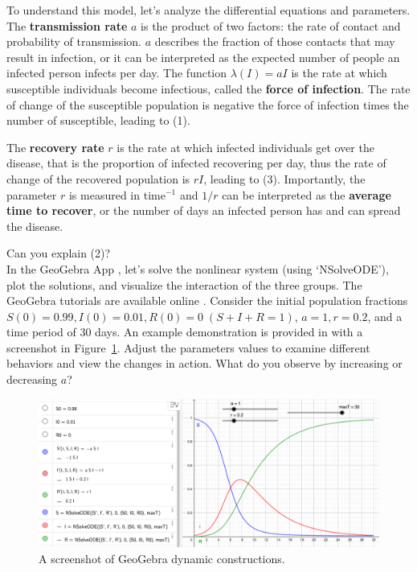 \documentclass[10pt,letterpaper]{article}
\begin{document}
To understand this model, let's analyze the differential equations and parameters. The {\bf transmission rate} $a$ is the product of two factors:  the rate of contact and probability of transmission. $a$ describes the fraction of those contacts that may result in infection, or it can be interpreted as the expected number of people an infected person infects per day. The function $\lambda(I)=aI$ is the rate at which susceptible individuals become infectious, called the {\bf force of infection}. The rate of change of the susceptible population is negative the force of infection times the number of susceptible, leading to (1).

The {\bf recovery rate} $r$ is the rate at which infected individuals get over the disease, that is the proportion of infected recovering per day, thus the rate of change of the recovered population is $rI$, leading to (3). Importantly, the parameter $r$ is measured in time$^{-1}$ and $1/r$ can be interpreted as the {\bf average time to recover}, or the number of days an infected person has and can spread the disease.

Can you explain (2)?\\

In the GeoGebra App \cite{GeoGebra1}, let's solve the nonlinear system (using `NSolveODE'), plot the solutions, and visualize the interaction of the three groups. The GeoGebra tutorials are available online \cite{GeoGebra2}. Consider the initial population fractions $S(0)=0.99, I(0)=0.01, R(0)=0 \; (S+I+R=1)$, $a=1, r=0.2$, and a time period of 30 days. An example demonstration is provided in \cite{Wang2020} with a screenshot in Figure~\ref{fig:GeoGebra}. Adjust the parameters values to examine different behaviors and view the changes in action. What do you observe by increasing or decreasing $a$? 

\begin{figure}[htb]
\includegraphics[width=5.4in]{GeoGebra}
\centering
\caption{\label{fig:GeoGebra}A screenshot of GeoGebra dynamic constructions.}
\end{figure}
\end{document}
